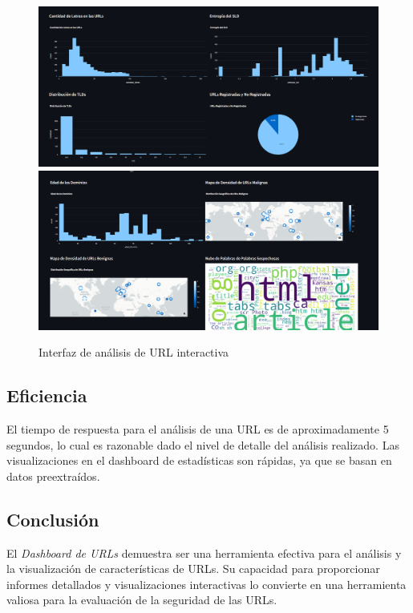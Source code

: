 \begin{figure}[H]
    \centering
    \includegraphics[width=\textwidth]{imageDashboard1.png}
    \includegraphics[width=\textwidth]{imageDashboard2.png}
    \caption{Interfaz de análisis de URL interactiva}
\end{figure}

\subsection*{Eficiencia}

El tiempo de respuesta para el análisis de una URL es de aproximadamente 5 segundos, lo cual es razonable dado el nivel de detalle del análisis realizado. Las visualizaciones en el dashboard de estadísticas son rápidas, ya que se basan en datos preextraídos.

\subsection*{Conclusión}

El \textit{Dashboard de URLs} demuestra ser una herramienta efectiva para el análisis y la visualización de características de URLs. Su capacidad para proporcionar informes detallados y visualizaciones interactivas lo convierte en una herramienta valiosa para la evaluación de la seguridad de las URLs.

